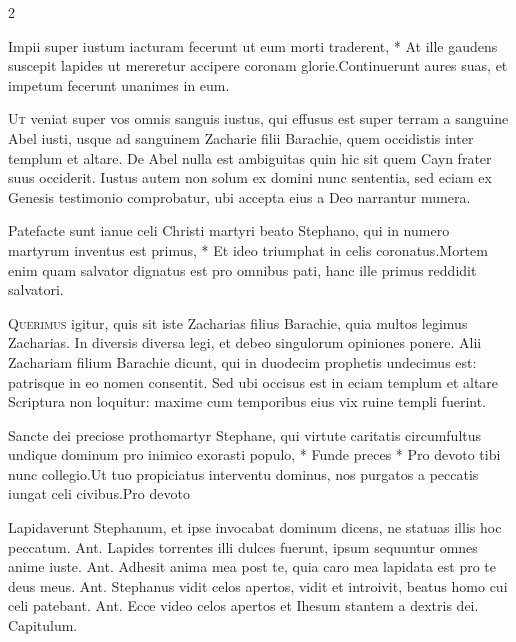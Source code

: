 \begin{multicols*}{2}
\begin{responsory}
{Impii super iustum iacturam fecerunt ut eum morti traderent, * At ille gaudens suscepit lapides ut mereretur accipere coronam glorie.}{Continuerunt aures suas, et impetum fecerunt unanimes in eum.}
\end{responsory}%
\lettrine[lines=2]{\zallmancaps \color{Red} U}{t} veniat super vos omnis sanguis iustus, qui effusus est super terram a sanguine Abel iusti, usque ad sanguinem Zacharie filii Barachie, quem occidistis inter templum et altare. De Abel nulla est ambiguitas quin hic sit quem Cayn frater suus occiderit. Iustus autem non solum ex domini nunc sententia, sed eciam ex Genesis testimonio comprobatur, ubi accepta eius a Deo narrantur munera.
\begin{responsory}
{Patefacte sunt ianue celi Christi martyri beato Stephano, qui in numero martyrum inventus est primus, * Et ideo triumphat in celis coronatus.}{Mortem enim quam salvator dignatus est pro omnibus pati, hanc ille primus reddidit salvatori.}
\end{responsory}%
\lettrine[lines=2]{\zallmancaps \color{Blue} Q}{uerimus} igitur, quis sit iste Zacharias filius Barachie, quia multos legimus Zacharias. In diversis diversa legi, et debeo singulorum opiniones ponere. Alii Zachariam filium Barachie dicunt, qui in duodecim prophetis undecimus est: patrisque in eo nomen consentit. Sed ubi occisus est in eciam templum et altare Scriptura non loquitur: maxime cum temporibus eius vix ruine templi fuerint.
\begin{responsory-final}
{Sancte dei preciose prothomartyr Stephane, qui virtute caritatis circumfultus undique dominum pro inimico exorasti populo, * Funde preces * Pro devoto tibi nunc collegio.}{Ut tuo propiciatus interventu dominus, nos purgatos a peccatis iungat celi civibus.}{Pro devoto}
\end{responsory-final}%
 Lapidaverunt Stephanum, et ipse invocabat dominum dicens, ne statuas illis hoc peccatum. {\color{Red} Ant.} Lapides torrentes illi dulces fuerunt, ipsum sequuntur omnes anime iuste. {\color{Red} Ant.} Adhesit anima mea post te, quia caro mea lapidata est pro te deus meus. {\color{Red} Ant.} Stephanus vidit celos apertos, vidit et introivit, beatus homo cui celi patebant. {\color{Red} Ant.} Ecce video celos apertos et Ihesum stantem a dextris dei. {\color{Red} Capitulum.}

\end{multicols*}
